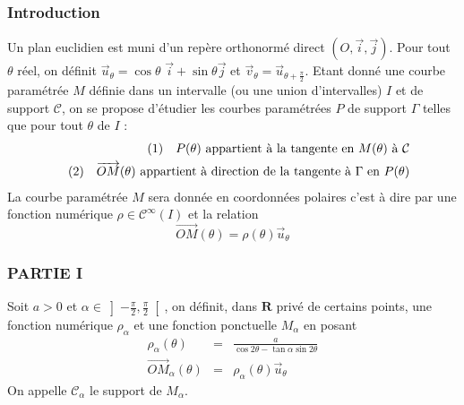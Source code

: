\subsubsection*{Introduction}

Un plan euclidien est muni d'un rep\`{e}re orthonorm\'{e} direct $(O,%
\overrightarrow{i},\overrightarrow{j}).$ Pour tout $\theta $ r\'{e}el, on
d\'{e}finit $\overrightarrow{u}_{\theta }=\cos \theta $ $\overrightarrow{i}%
+\sin \theta \overrightarrow{j}$ et $\overrightarrow{v}_{\theta }=%
\overrightarrow{u}_{\theta +\frac{\pi }{2}}$.\newline
Etant donn\'{e} une courbe param\'{e}tr\'{e}e $M$ d\'{e}finie dans un
intervalle (ou une union d'intervalles) $I$ et de support $\mathcal{C}$, on
se propose d'\'{e}tudier les courbes param\'{e}tr\'{e}es $P$ de support $%
\Gamma $ telles que pour tout $\theta $ de $I$ : 
\begin{eqnarray*}
&&(1)\quad P(\theta )\text{ appartient \`{a} la tangente en }M(\theta )\text{
\`{a} }\mathcal{C}\newline
\\
&&(2)\quad \overrightarrow{OM}(\theta )\text{ appartient \`{a} direction de
la tangente \`{a} }\Gamma \text{ en }P(\theta )\newline
\end{eqnarray*}
La courbe param\'{e}tr\'{e}e $M$ sera donn\'{e}e en coordonn\'{e}es polaires
c'est \`{a} dire par une fonction num\'{e}rique $\rho \in \mathcal{C}%
^{\infty }(I)$ et la relation 
\[
\overrightarrow{OM}(\theta )=\rho (\theta )\overrightarrow{u}_{\theta } 
\]

\subsubsection*{PARTIE I}

Soit $a>0$ et $\alpha \in \left] -\frac{\pi }{2},\frac{\pi }{2}\right[ $, on
d\'{e}finit, dans $\mathbf{R}$ priv\'{e} de certains points, une fonction
num\'{e}rique $\rho _{\alpha }$ et une fonction ponctuelle $M_{\alpha }$ en
posant 
\begin{eqnarray*}
\rho _{\alpha }(\theta ) &=&\frac{a}{\cos 2\theta -\tan \alpha \sin 2\theta }
\\
\overrightarrow{OM}_{\alpha }(\theta ) &=&\rho _{\alpha }(\theta )%
\overrightarrow{u}_{\theta }
\end{eqnarray*}
On appelle $\mathcal{C}_{\alpha }$ le support de $M_{\alpha }$.

